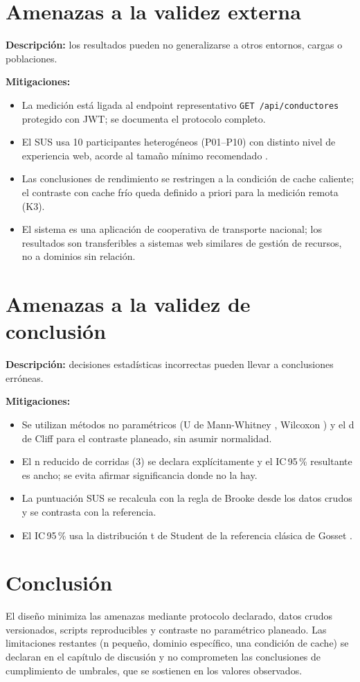 \section{Amenazas a la validez externa}

\textbf{Descripción:} los resultados pueden no generalizarse a otros entornos,
cargas o poblaciones.

\textbf{Mitigaciones:}
\begin{itemize}
  \item La medición está ligada al endpoint representativo \texttt{GET /api/conductores}
        protegido con JWT; se documenta el protocolo completo.
  \item El SUS usa 10 participantes heterogéneos (P01--P10) con distinto nivel de
        experiencia web, acorde al tamaño mínimo recomendado
        \cite{kortum2013,lewis2009}.
  \item Las conclusiones de rendimiento se restringen a la condición de cache
        caliente; el contraste con cache frío queda definido a priori para la
        medición remota (K3).
  \item El sistema es una aplicación de cooperativa de transporte nacional; los
        resultados son transferibles a sistemas web similares de gestión de
        recursos, no a dominios sin relación.
\end{itemize}

\section{Amenazas a la validez de conclusión}

\textbf{Descripción:} decisiones estadísticas incorrectas pueden llevar a
conclusiones erróneas.

\textbf{Mitigaciones:}
\begin{itemize}
  \item Se utilizan métodos no paramétricos (U de Mann-Whitney \cite{mann_whitney1947},
        Wilcoxon \cite{wilcoxon1945}) y el d de Cliff \cite{cliff1993} para el
        contraste planeado, sin asumir normalidad.
  \item El n reducido de corridas (3) se declara explícitamente y el IC\,95\,\%
        resultante es ancho; se evita afirmar significancia donde no la hay.
  \item La puntuación SUS se recalcula con la regla de Brooke desde los datos
        crudos y se contrasta con la referencia.
  \item El IC\,95\,\% usa la distribución t de Student de la referencia clásica
        de Gosset \cite{student1908}.
\end{itemize}

\section{Conclusión}

El diseño minimiza las amenazas mediante protocolo declarado, datos crudos
versionados, scripts reproducibles y contraste no paramétrico planeado. Las
limitaciones restantes (n pequeño, dominio específico, una condición de cache)
se declaran en el capítulo de discusión y no comprometen las conclusiones de
cumplimiento de umbrales, que se sostienen en los valores observados.